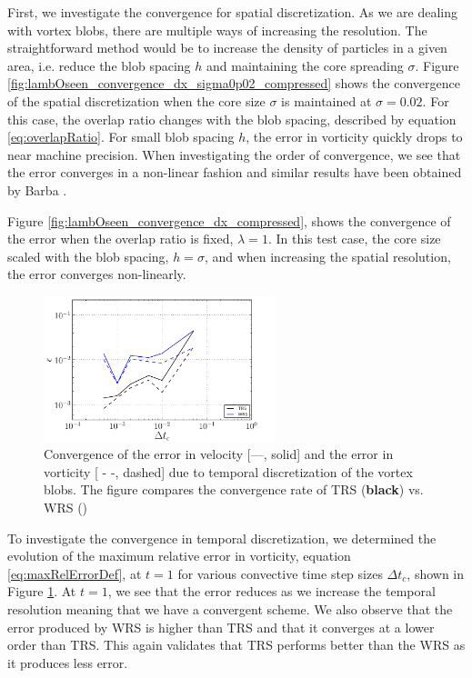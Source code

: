 First, we investigate the convergence for spatial discretization. As we are dealing with vortex blobs, there are multiple ways of increasing the resolution. The straightforward method would be to increase the density of particles in a given area, i.e. reduce the blob spacing $h$ and maintaining the core spreading $\sigma$. Figure \ref{fig:lambOseen_convergence_dx_sigma0p02_compressed} shows the convergence of the spatial discretization when the core size $\sigma$ is maintained at $\sigma=0.02$. For this case, the overlap ratio changes with the blob spacing, described by equation \ref{eq:overlapRatio}. For small blob spacing $h$, the error in vorticity quickly drops to near machine precision. When investigating the order of convergence, we see that the error converges in a non-linear fashion and similar results have been obtained by Barba \cite{Barba2004c}.

Figure \ref{fig:lambOseen_convergence_dx_compressed}, shows the convergence of the error when the overlap ratio is fixed, $\lambda = 1$. In this test case, the core size scaled with the blob spacing, $h=\sigma$, and when increasing the spatial resolution, the error converges non-linearly.
	
	\begin{figure}[!t]
	\centering
	\includegraphics[width=0.6\textwidth]{figures/lagrangian/lambOseen_dtConvergence_WRSvsTRS.pdf}
	\caption{Convergence of the error in velocity [---, solid] and the error in vorticity [ - -, dashed] due to temporal discretization of the vortex blobs. The figure compares the convergence rate of TRS (\textbf{black}) vs. WRS ({})}
	\label{fig:lambOseen_dtConvergence_WRSvsTRS}
	\end{figure}	
	
To investigate the convergence in temporal discretization, we determined the evolution of the maximum relative error in vorticity, equation \ref{eq:maxRelErrorDef}, at $t=1$ for various convective time step sizes $\Delta t_c$, shown in Figure \ref{fig:lambOseen_dtConvergence_WRSvsTRS}. At $t=1$, we see that the error reduces as we increase the temporal resolution meaning that we have a convergent scheme. We also observe that the error produced by WRS is higher than TRS and that it converges at a lower order than TRS. This again validates that TRS performs better than the WRS as it produces less error.


